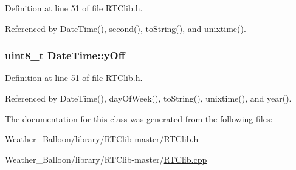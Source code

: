 Definition at line 51 of file R\+T\+Clib.\+h.



Referenced by Date\+Time(), second(), to\+String(), and unixtime().

\subsubsection[{\texorpdfstring{y\+Off}{yOff}}]{\setlength{\rightskip}{0pt plus 5cm}uint8\+\_\+t Date\+Time\+::y\+Off\hspace{0.3cm}{\ttfamily [protected]}}\hypertarget{class_date_time_ac0b5906cbb32751988603bf0388e7ab9}{}\label{class_date_time_ac0b5906cbb32751988603bf0388e7ab9}


Definition at line 51 of file R\+T\+Clib.\+h.



Referenced by Date\+Time(), day\+Of\+Week(), to\+String(), unixtime(), and year().



The documentation for this class was generated from the following files\+:\begin{DoxyCompactItemize}
\item 
Weather\+\_\+\+Balloon/library/\+R\+T\+Clib-\/master/\hyperlink{_r_t_clib_8h}{R\+T\+Clib.\+h}\item 
Weather\+\_\+\+Balloon/library/\+R\+T\+Clib-\/master/\hyperlink{_r_t_clib_8cpp}{R\+T\+Clib.\+cpp}\end{DoxyCompactItemize}
